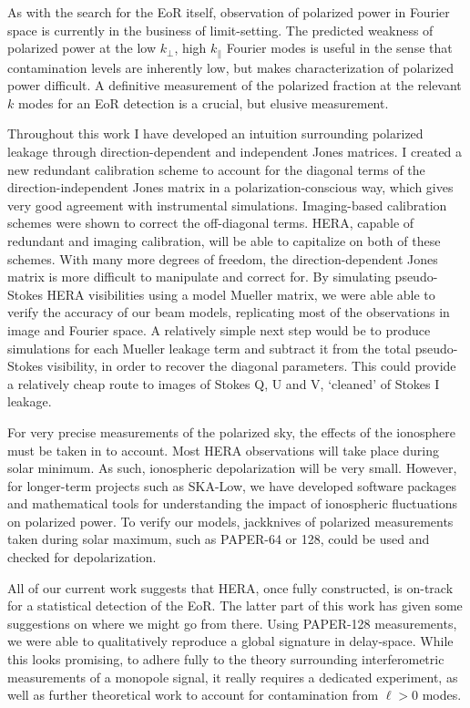 {As with the search for the EoR itself, observation of polarized power in Fourier space is currently in the business of limit-setting. The predicted weakness of polarized power at the low $k_{\perp}$, high $k_{\parallel}$ Fourier modes is useful in the sense that contamination levels are inherently low, but makes characterization of polarized power difficult. A definitive measurement of the polarized fraction at the relevant $k$ modes for an EoR detection is a crucial, but elusive measurement.

Throughout this work I have developed an intuition surrounding polarized leakage through direction-dependent and independent Jones matrices. I created a new redundant calibration scheme to account for the diagonal terms of the direction-independent Jones matrix in a polarization-conscious way, which gives very good agreement with instrumental simulations. Imaging-based calibration schemes were shown to correct the off-diagonal terms. HERA, capable of redundant and imaging calibration, will be able to capitalize on both of these schemes. With many more degrees of freedom, the direction-dependent Jones matrix is more difficult to manipulate and correct for. By simulating pseudo-Stokes HERA visibilities using a model Mueller matrix, we were able able to verify the accuracy of our beam models, replicating most of the observations in image and Fourier space. A relatively simple next step would be to produce simulations for each Mueller leakage term and subtract it from the total pseudo-Stokes visibility, in order to recover the diagonal parameters. This could provide a relatively cheap route to images of Stokes Q, U and V, `cleaned' of Stokes I leakage.

For very precise measurements of the polarized sky, the effects of the ionosphere must be taken in to account. Most HERA observations will take place during solar minimum. As such, ionospheric depolarization will be very small. However, for longer-term projects such as SKA-Low, we have developed software packages and mathematical tools for understanding the impact of ionospheric fluctuations on polarized power. To verify our models, jackknives of polarized measurements taken during solar maximum, such as PAPER-64 or 128, could be used and checked for depolarization.

All of our current work suggests that HERA, once fully constructed, is on-track for a statistical detection of the EoR. The latter part of this work has given some suggestions on where we might go from there. Using PAPER-128 measurements, we were able to qualitatively reproduce a global signature in delay-space. While this looks promising, to adhere fully to the theory surrounding interferometric measurements of a monopole signal, it really requires a dedicated experiment, as well as further theoretical work to account for contamination from $\ell > 0$ modes.

}
